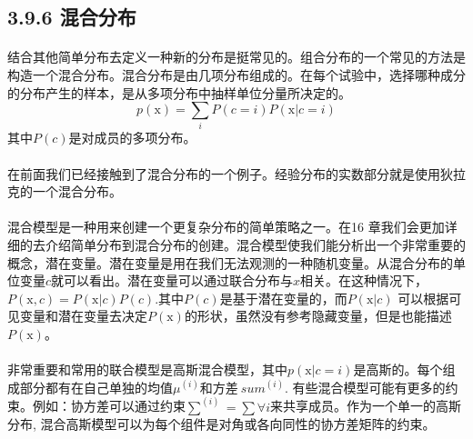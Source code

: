 \documentclass{article}
\begin{document}
    \subsection*{3.9.6 混合分布}
    \paragraph{}
    结合其他简单分布去定义一种新的分布是挺常见的。组合分布的一个常见的方法是构造一个混合分布。混合分布是由几项分布组成的。在每个试验中，选择哪种成分的分布产生的样本，是从多项分布中抽样单位分量所决定的。
    \begin{equation}
      p(\mathrm{x})=\sum_{i}P(c=i)P(\mathrm{x}|c=i)  \tag{3.29}
    \end{equation}
    其中$P(c)$是对成员的多项分布。
    \paragraph{}
    在前面我们已经接触到了混合分布的一个例子。经验分布的实数部分就是使用狄拉克的一个混合分布。
    \paragraph{}
    混合模型是一种用来创建一个更复杂分布的简单策略之一。在16 章我们会更加详细的去介绍简单分布到混合分布的创建。混合模型使我们能分析出一个非常重要的概念，潜在变量。潜在变量是用在我们无法观测的一种随机变量。从混合分布的单位变量$c$就可以看出。潜在变量可以通过联合分布与$x$相关。在这种情况下，$P(\mathrm{x},c)=P(\mathrm{x}|c)P(c)$.其中$P(c)$是基于潜在变量的，而$P(\mathrm{x}|c)$ 可以根据可见变量和潜在变量去决定$P(\mathrm{x})$的形状，虽然没有参考隐藏变量，但是也能描述$P(\mathrm{x})$。
    \paragraph{}
    非常重要和常用的联合模型是高斯混合模型，其中$p(\mathrm{x}|c=i)$是高斯的。每个组成部分都有在自己单独的均值$\mu^{(i)}$和方差$\ sum^{(i)}$. 有些混合模型可能有更多的约束。例如：协方差可以通过约束$\sum^{(i)}=\sum\forall i$来共享成员。作为一个单一的高斯分布, 混合高斯模型可以为每个组件是对角或各向同性的协方差矩阵的约束。
\end{document}
